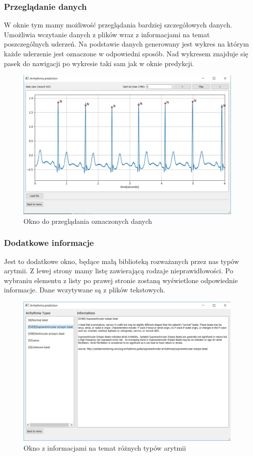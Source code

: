 \documentclass[polish,12pt]{aghthesis}
\begin{document}
\subsubsection{Przeglądanie danych}

W oknie tym mamy możliwość przeglądania bardziej szczegółowych danych. Umożliwia wczytanie danych z plików wraz z informacjami na temat poszczególnych uderzeń. Na podstawie danych generowany jest wykres na którym każde uderzenie jest oznaczone w odpowiedni sposób. Nad wykresem znajduje się pasek do nawigacji po wykresie taki sam jak w oknie predykcji.

\begin{figure}[h!]
	\centering
	\includegraphics[width=0.8\linewidth]{explore.png}
	\caption{Okno do przeglądania oznaczonych danych}
	\label{fig:explore}
\end{figure}

\subsubsection{Dodatkowe informacje}

Jest to dodatkowe okno, będące małą biblioteką rozważanych przez nas typów arytmii. Z lewej strony mamy listę zawierającą rodzaje nieprawidłowości. Po wybraniu elementu z listy po prawej stronie zostaną wyświetlone odpowiednie informacje. Dane wczytywane są z plików tekstowych.

\begin{figure}[H]
	\centering
	\includegraphics[width=0.7\linewidth]{types.png}
	\caption{Okno z informacjami na temat różnych typów arytmii}
	\label{fig:types}
\end{figure}
\end{document}
